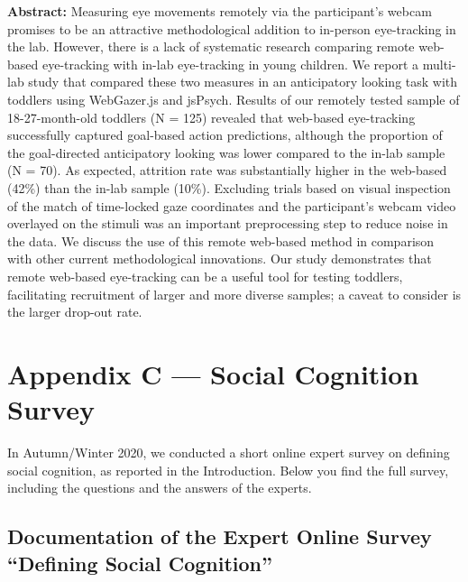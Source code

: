 \documentclass[
]{scrbook}
\begin{document}
\textbf{Abstract:} Measuring eye movements remotely via the participant's webcam promises to be an attractive methodological addition to in-person eye-tracking in the lab. However, there is a lack of systematic research comparing remote web-based eye-tracking with in-lab eye-tracking in young children. We report a multi-lab study that compared these two measures in an anticipatory looking task with toddlers using WebGazer.js and jsPsych. Results of our remotely tested sample of 18-27-month-old toddlers (N = 125) revealed that web-based eye-tracking successfully captured goal-based action predictions, although the proportion of the goal-directed anticipatory looking was lower compared to the in-lab sample (N = 70). As expected, attrition rate was substantially higher in the web-based (42\%) than the in-lab sample (10\%). Excluding trials based on visual inspection of the match of time-locked gaze coordinates and the participant's webcam video overlayed on the stimuli was an important preprocessing step to reduce noise in the data. We discuss the use of this remote web-based method in comparison with other current methodological innovations. Our study demonstrates that remote web-based eye-tracking can be a useful tool for testing toddlers, facilitating recruitment of larger and more diverse samples; a caveat to consider is the larger drop-out rate.

\chapter{Appendix C --- Social Cognition Survey}\label{appendixC}

In Autumn/Winter 2020, we conducted a short online expert survey on defining social cognition, as reported in the Introduction. Below you find the full survey, including the questions and the answers of the experts.

\section*{Documentation of the Expert Online Survey ``Defining Social Cognition''}\label{social-cognition-survey}

\begin{minipage}{\textwidth}

\end{minipage}
\end{document}
